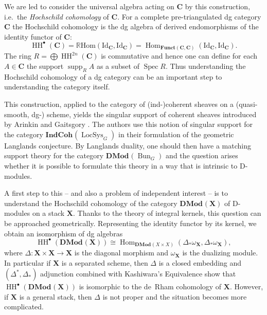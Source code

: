 \documentclass{oupau}
\theoremstyle{remark}
\DeclareMathOperator\Spec{Spec}
\let\stack\mathbf                           %
\newcommand\LocSys{\operatorname{LocSys}}   %
\newcommand\Bun{\operatorname{Bun}}         %
\newcommand\cat{\mathbf}                    %
\DeclareMathOperator\Hom{Hom}
\newcommand\id[1][]{{\mathrm{Id}_{#1}}}     %
\newcommand\cx\bullet                       %
\newcommand{\HCoh}{\operatorname{HH}^\cx}   %
\DeclareMathOperator\supp{supp}     %
\newcommand\catDMod[2][]{\cat{DMod}_{#1}(#2)}   %
\newcommand\catIndCoh[2][]{\cat{IndCoh}_{#1}(#2)} %
\begin{document}
We are led to consider the universal algebra acting on $\cat C$ by this construction, i.e.~the \emph{Hochschild cohomology} of $\cat C$.
For a complete pre-triangulated dg category $\cat C$ the Hochschild cohomology is the dg algebra of derived endomorphisms of the identity functor of $\cat C$:
\[
    \HCoh(\cat C)
    = \mathbb{R}\mathrm{Hom}(\id[\cat C], \id[\cat C])
    = \Hom_{\cat{Funct}(\cat C, \cat C)}(\id[\cat C], \id[\cat C]).
\]
The ring $R = \bigoplus \operatorname{HH}^{2n}(\cat C)$ is commutative and hence one can define for each $A ∈ \cat C$ the support $\supp_R A$ as a subset of $\Spec R$.
Thus understanding the Hochschild cohomology of a dg category can be an important step to understanding the category itself.

This construction, applied to the category of (ind-)coherent sheaves on a (quasi-smooth, dg-) scheme, yields the singular support of coherent sheaves introduced by Arinkin and Gaitsgory \cite{ArinkinGaitsgory:2015:SingularSupport}.
The authors use this notion of singular support for the category $\catIndCoh{\LocSys_G}$ in their formulation of the geometric Langlands conjecture.
By Langlands duality, one should then have a matching support theory for the category $\catDMod{\Bun_G}$ and the question arises whether it is possible to formulate this theory in a way that is intrinsic to D-modules.

A first step to this -- and also a problem of independent interest -- is to understand the Hochschild cohomology of the category $\catDMod{\stack X}$ of D-modules on a stack $\stack X$.
Thanks to the theory of integral kernels, this question can be approached geometrically.
Representing the identity functor by its kernel, we obtain an isomorphism of dg algebras
\begin{equation}
    \label{eq:intro:d-mod-hcoh}
    \HCoh(\catDMod{\stack X}) \cong \Hom_{\catDMod{X×X}}(Δ_*ω_{\stack X}, Δ_*ω_{\stack X}),
\end{equation}
where $Δ\colon \stack X × \stack X → \stack X$ is the diagonal morphism and $ω_{\stack X}$ is the dualizing module.
In particular if $\stack X$ is a separated scheme, then $Δ$ is a closed embedding and $(Δ^*,Δ_*)$ adjunction combined with Kashiwara's Equivalence show that $\HCoh(\catDMod{\stack X})$ is isomorphic to the de~Rham cohomology of $\stack X$.
However, if $\stack X$ is a general stack, then $Δ$ is not proper and the situation becomes more complicated.
\end{document}
